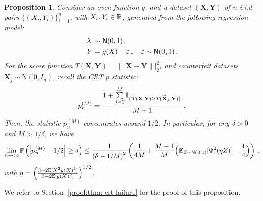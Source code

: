\documentclass[11pt]{article}
\newtheorem{propo}{Proposition}[section]
\def\bX{\mathbf{X}}
\def\bY{\mathbf{Y}}
\def\normal{\mathsf{N}}
\def\tbX{\widetilde{\bX}}
\begin{document}

\begin{propo}\label{thm: crt-failure}
Consider an even function $g$, and a dataset $(\bX,\bY)$ of $n$ i.i.d pairs $\{(X_i,Y_i)\}_{i=1}^n$, with $X_i, Y_i\in {\mathbb R}$, generated from the following regression model:
\begin{align} \label{eq: example:thm}
X&\sim \normal(0,1)\,, \nonumber \\
Y&=g(X)+\eps\,, \quad \eps\sim\normal(0,1)\,.
\end{align}
 For the score function $T(\bX,\bY)= \||\bX-\bY\||_2^2$, and counterfeit datasets $\tbX_{j}\sim\normal(0,I_{n})$, recall the CRT $p$ statistic:
\begin{align}\label{eq:pMn}
p^{(M)}_n=\frac{1+\sum\limits_{j=1}^{M}\ind_{ \{T(\bX,\bY)\geq T(\tbX_{j},\bY)\} } }{M+1}\,.
\end{align}
Then, the statistic $p^{(M)}_n$ concentrates around $1/2$. In particular, for any $\delta>0$ and $M>1/\delta$, we have
\[
\lim\limits_{n\rightarrow \infty}^{}\prob\left(\left|  p^{(M)}_n -1/2 \right| \geq \delta \right) \leq  \frac{1}{\left( \delta-1/M\right)^2} \left(   \frac{1}{4M} + \frac{M-1}{M} \Big(\E_{Z\sim\normal(0,1)}[\Phi^2(\eta Z)] -\frac{1}{4}\Big)  \right)\,,
\]
with $\eta=\left(\frac{3+2{\mathbb E}[X^2g(X)^2]}{3+2{\mathbb E}[g(X)^2]}\right)^{1/2}$.
 \end{propo}
 We refer to Section~\ref{proof:thm: crt-failure} for the proof of this proposition.
  
\end{document}
